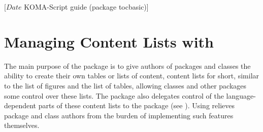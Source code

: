 %
%
%
%
%
%
%
%
% 
%
%
%
%

                 [$Date$
                  KOMA-Script guide (package tocbasic)]



\chapter{Managing Content Lists with }
\BeginIndexGroup%
%
%
%
%
The main purpose of the  package is to give authors of
packages and classes the ability to create their own tables or lists of
content, content lists for short, similar to the list of figures and the list
of tables, allowing classes and other packages some control over these lists.
The  package also delegates control of the
language-dependent parts of these content lists to the
 package (see \cite{package:babel}). Using
 relieves package and class authors from the burden of
implementing such features themselves.

